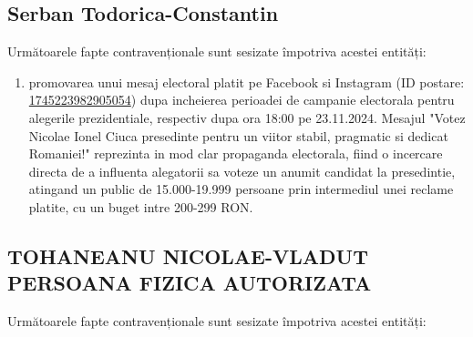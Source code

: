 \documentclass[a4paper,12pt]{article}
\begin{document}
\vspace{0.5cm}

\subsection{Serban Todorica-Constantin}
Următoarele fapte contravenționale sunt sesizate împotriva acestei entități:

\begin{enumerate}[leftmargin=*, label=\arabic*.)]
    \item promovarea unui mesaj electoral platit pe Facebook si Instagram (ID postare: \href{https://www.facebook.com/ads/library/?id=1745223982905054}{1745223982905054}) dupa incheierea perioadei de campanie electorala pentru alegerile prezidentiale, respectiv dupa ora 18:00 pe 23.11.2024. Mesajul "Votez Nicolae Ionel Ciuca presedinte pentru un viitor stabil, pragmatic si dedicat Romaniei!" reprezinta in mod clar propaganda electorala, fiind o incercare directa de a influenta alegatorii sa voteze un anumit candidat la presedintie, atingand un public de 15.000-19.999 persoane prin intermediul unei reclame platite, cu un buget intre 200-299 RON.
\end{enumerate}

\vspace{0.5cm}

\subsection{TOHANEANU NICOLAE-VLADUT PERSOANA FIZICA AUTORIZATA}
Următoarele fapte contravenționale sunt sesizate împotriva acestei entități:
\end{document}
